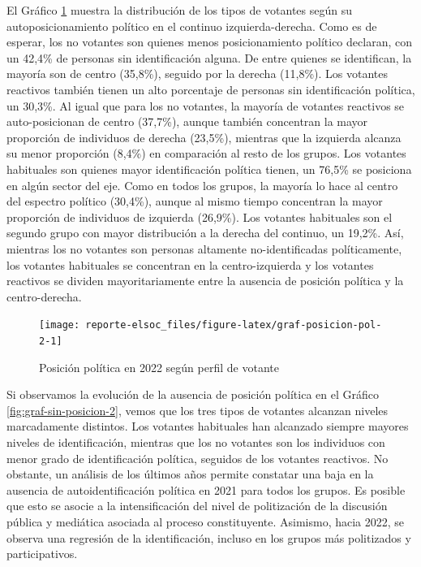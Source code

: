\documentclass[
  12pt,
]{book}
\begin{document}
El Gráfico \ref{fig:graf-posicion-pol-2} muestra la distribución de los tipos de votantes según su autoposicionamiento político en el continuo izquierda-derecha. Como es de esperar, los no votantes son quienes menos posicionamiento político declaran, con un 42,4\% de personas sin identificación alguna. De entre quienes se identifican, la mayoría son de centro (35,8\%), seguido por la derecha (11,8\%). Los votantes reactivos también tienen un alto porcentaje de personas sin identificación política, un 30,3\%. Al igual que para los no votantes, la mayoría de votantes reactivos se auto-posicionan de centro (37,7\%), aunque también concentran la mayor proporción de individuos de derecha (23,5\%), mientras que la izquierda alcanza su menor proporción (8,4\%) en comparación al resto de los grupos. Los votantes habituales son quienes mayor identificación política tienen, un 76,5\% se posiciona en algún sector del eje. Como en todos los grupos, la mayoría lo hace al centro del espectro político (30,4\%), aunque al mismo tiempo concentran la mayor proporción de individuos de izquierda (26,9\%). Los votantes habituales son el segundo grupo con mayor distribución a la derecha del continuo, un 19,2\%. Así, mientras los no votantes son personas altamente no-identificadas políticamente, los votantes habituales se concentran en la centro-izquierda y los votantes reactivos se dividen mayoritariamente entre la ausencia de posición política y la centro-derecha.

\begin{figure}

{\centering \texttt{[image: reporte-elsoc\_files/figure-latex/graf-posicion-pol-2-1]} 

}

\caption{Posición política en 2022 según perfil de votante}\label{fig:graf-posicion-pol-2}
\end{figure}

Si observamos la evolución de la ausencia de posición política en el Gráfico \ref{fig:graf-sin-posicion-2}, vemos que los tres tipos de votantes alcanzan niveles marcadamente distintos. Los votantes habituales han alcanzado siempre mayores niveles de identificación, mientras que los no votantes son los individuos con menor grado de identificación política, seguidos de los votantes reactivos. No obstante, un análisis de los últimos años permite constatar una baja en la ausencia de autoidentificación política en 2021 para todos los grupos. Es posible que esto se asocie a la intensificación del nivel de politización de la discusión pública y mediática asociada al proceso constituyente. Asimismo, hacia 2022, se observa una regresión de la identificación, incluso en los grupos más politizados y participativos.
\end{document}
